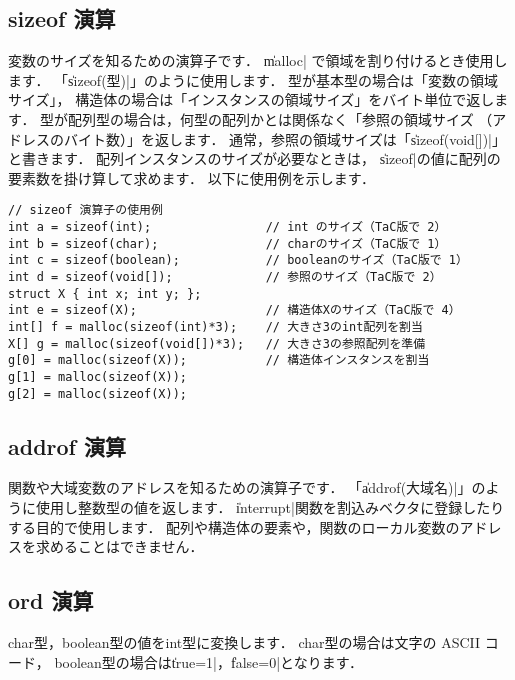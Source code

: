 \subsection{sizeof 演算}

変数のサイズを知るための演算子です．
\|malloc| で領域を割り付けるとき使用します．
「\|sizeof(型)|」のように使用します．
型が基本型の場合は「変数の領域サイズ」，
構造体の場合は「インスタンスの領域サイズ」をバイト単位で返します．
型が配列型の場合は，何型の配列かとは関係なく「参照の領域サイズ
（アドレスのバイト数）」を返します．
通常，参照の領域サイズは「\|sizeof(void[])|」と書きます．
配列インスタンスのサイズが必要なときは，
\|sizeof|の値に配列の要素数を掛け算して求めます．
以下に使用例を示します．

\begin{mylist}
\begin{verbatim}
// sizeof 演算子の使用例
int a = sizeof(int);                // int のサイズ（TaC版で 2）
int b = sizeof(char);               // charのサイズ（TaC版で 1）
int c = sizeof(boolean);            // booleanのサイズ（TaC版で 1）
int d = sizeof(void[]);             // 参照のサイズ（TaC版で 2）
struct X { int x; int y; };
int e = sizeof(X);                  // 構造体Xのサイズ（TaC版で 4）
int[] f = malloc(sizeof(int)*3);    // 大きさ3のint配列を割当
X[] g = malloc(sizeof(void[])*3);   // 大きさ3の参照配列を準備
g[0] = malloc(sizeof(X));           // 構造体インスタンスを割当
g[1] = malloc(sizeof(X));
g[2] = malloc(sizeof(X));
\end{verbatim}
\end{mylist}

\subsection{addrof 演算}
\label{chap3:addrof}

関数や大域変数のアドレスを知るための演算子です．
「\|addrof(大域名)|」のように使用し整数型の値を返します．
\|interrupt|関数を割込みベクタに登録したりする目的で使用します．
配列や構造体の要素や，関数のローカル変数のアドレスを求めることはできません．

\subsection{ord 演算}
\label{chap3:ord}

char型，boolean型の値をint型に変換します．
char型の場合は文字の ASCII コード，
boolean型の場合は\|true=1|，\|false=0|となります．

